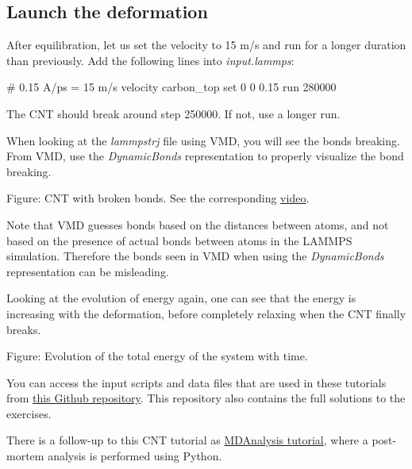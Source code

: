 \subsection{Launch the deformation}
After equilibration, let us set the velocity to 15 m/s and run for
a longer duration than previously. Add the following lines into
\textit{input.lammps}:

\begin{lcverbatim}
# 0.15 A/ps = 15 m/s
velocity carbon_top set 0 0 0.15
run 280000
\end{lcverbatim}

\noindent The CNT should break around step 250000. If not, 
use a longer run. 

\vspace{0.25cm} \noindent When looking at the \textit{lammpstrj} file using VMD, you will see
the bonds breaking. From VMD, use the \textit{DynamicBonds}
representation to properly visualize the bond breaking.

\vspace{0.25cm} Figure: CNT with broken bonds. See the corresponding \href{https://youtu.be/H2_cjoTcVAM}{video}.

\begin{tcolorbox}[colback=mylightblue!5!white,colframe=mylightblue!75!black,title=About bonds in VMD]

\vspace{0.25cm} \noindent Note that VMD guesses bonds based on the distances
between atoms, and not based on the presence of actual
bonds between atoms in the LAMMPS simulation. Therefore the bonds seen
in VMD when using the \textit{DynamicBonds} representation can be misleading.
\end{tcolorbox}

\noindent Looking at the evolution of energy again, one can see that the energy is increasing 
with the deformation, before completely relaxing when the CNT finally breaks.

\vspace{0.25cm} Figure: Evolution of the total energy of the system with time.

\vspace{0.25cm} \noindent You can access the input scripts and data files that
are used in these tutorials from \href{https://github.com/lammpstutorials/lammpstutorials-inputs/}{this Github repository}.
This repository also contains the full solutions to the exercises.

\vspace{0.25cm} \noindent There is a follow-up to this CNT tutorial as \hyperref[mda-label]{MDAnalysis tutorial},
where a post-mortem analysis is performed using Python.

